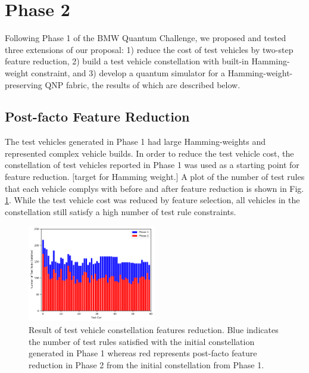 \documentclass[aps,pra,twocolumn,superscriptaddress,groupedaddress]{revtex4}  %
\begin{document}
\clearpage

\section{Phase 2}

Following Phase 1 of the BMW Quantum Challenge, we proposed and tested three extensions
of our proposal: 1) reduce the cost of test vehicles by two-step feature reduction,
2) build a test vehicle constellation with built-in Hamming-weight constraint, and 
3) develop a quantum simulator for a Hamming-weight-preserving QNP fabric, the results
of which are described below.

\subsection{Post-facto Feature Reduction}

The test vehicles generated in Phase 1 had large Hamming-weights and represented
complex vehicle builds. In order to reduce the test vehicle cost, the constellation
of test vehicles reported in Phase 1 was used as a starting point for feature reduction. 
{\color{red} [target for Hamming weight.]}
A plot of the number of test rules that each vehicle complys with before and after feature
reduction is shown in Fig. \ref{fig:6-reduce}. While the test vehicle cost was reduced
by feature selection, all vehicles in the constellation still satisfy a high number of
test rule constraints. 

\begin{figure}
\begin{center}
\includegraphics[width=0.5\textwidth]{figures/phase2/6-reduce-rules.pdf}
\caption{Result of test vehicle constellation features  reduction.
         Blue indicates the number of test rules satisfied with the initial constellation
         generated in Phase 1 whereas red represents post-facto feature reduction in Phase 2
         from the initial constellation from Phase 1.}
\label{fig:6-reduce}
\end{center}
\end{figure}
\end{document}
